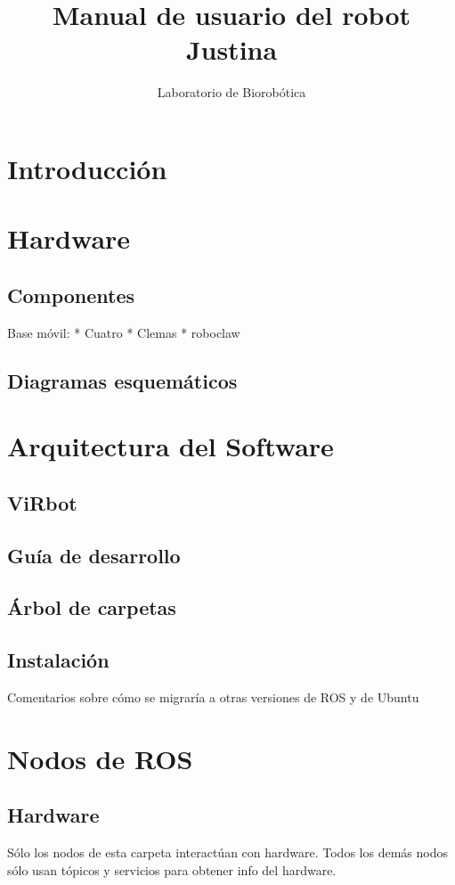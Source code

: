 \documentclass[a4paper,usenames,dvipsnames,svgnames,table]{book}
\title{Manual de usuario del robot Justina}
\author{Laboratorio de Biorobótica}
\begin{document}
\maketitle

\tableofcontents

\chapter{Introducción}

\chapter{Hardware}

\section{Componentes}
Base móvil: 
* Cuatro
* Clemas
* roboclaw
\section{Diagramas esquemáticos}


\chapter{Arquitectura del Software}
\section{ViRbot}
\section{Guía de desarrollo}
\section{Árbol de carpetas}
\section{Instalación}
Comentarios sobre cómo se migraría a otras versiones de ROS y de Ubuntu

\chapter{Nodos de ROS}

\section{Hardware}
Sólo los nodos de esta carpeta interactúan con hardware. Todos los demás nodos sólo usan tópicos y servicios para obtener info del hardware. 
\end{document}
